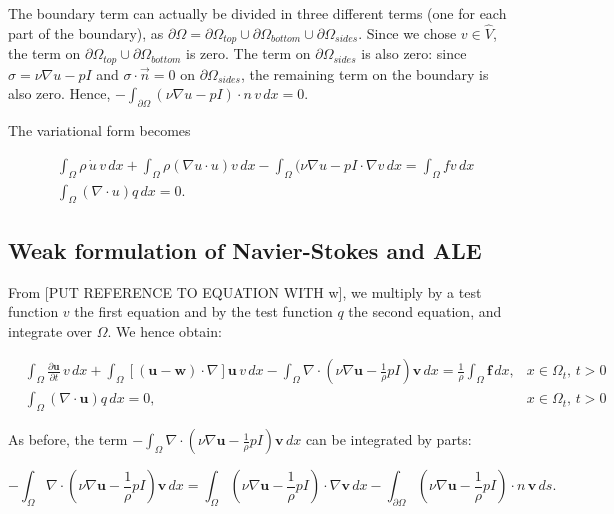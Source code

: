 \documentclass[11pt,a4paper,titlepage]{report}
\begin{document}
The boundary term can actually be divided in three different terms (one for each part of the boundary), as $\partial \Omega = \partial \Omega_{top} \cup \partial \Omega_{bottom} \cup \partial \Omega_{sides}$. Since we chose $v \in \hat{V}$, the term on $\partial \Omega_{top} \cup \partial \Omega_{bottom}$ is zero. The term on $\partial \Omega_{sides}$ is also zero: since $\sigma = \nu \nabla u - pI$ and $\sigma \cdot \vec{n} = 0$ on $\partial \Omega_{sides}$, the remaining term on the boundary is also zero. Hence, $- \int_{\partial \Omega} (\nu \nabla u - pI) \cdot n \, v \, dx = 0$.

The variational form becomes

\begin{align}
& \int_{\Omega} \rho \, \dot{u} \, v \, dx + \int_{\Omega} \rho (\nabla u \cdot u)v \, dx - \int_{\Omega} (\nu \nabla u - pI \cdot \nabla v \, dx = \int_{\Omega} fv \, dx \\
& \int_{\Omega} (\nabla \cdot u) q \, dx = 0.
\end{align}


\subsection{Weak formulation of Navier-Stokes and ALE}


From [PUT REFERENCE TO EQUATION WITH w], we multiply by a test function $v$ the first equation and by the test function $q$ the second equation, and integrate over $\Omega$. We hence obtain:


\[
\begin{aligned}
& \int_{\Omega} \frac{\partial \mathbf{u}}{\partial t} \, v \, dx 
+ \int_{\Omega} [(\mathbf{u - w}) \cdot \nabla] \mathbf{u} \, v \, dx
- \int_{\Omega} \nabla \cdot (\nu \nabla \mathbf{u} -  \frac{1}{\rho}  pI)\mathbf{v} \, dx
=  \frac{1}{\rho} \int_{\Omega} \mathbf{f} \, dx,  & x \in \Omega_t, \, t>0 \\
& \int_{\Omega}  (\nabla \cdot \mathbf{u}) q \, dx = 0 , & x \in \Omega_t, \, t>0
\end{aligned}
\]


As before, the term $- \int_{\Omega} \nabla \cdot (\nu \nabla \mathbf{u} -   \frac{1}{\rho}  pI)\mathbf{v} \, dx$ can be integrated by parts:

\[
- \int_{\Omega} \nabla \cdot (\nu \nabla \mathbf{u} -  \frac{1}{\rho} pI)\mathbf{v} \, dx =  \int_{\Omega} (\nu \nabla \mathbf{u} -  \frac{1}{\rho}  pI) \cdot \nabla \mathbf{v} \, dx - \int_{\partial \Omega} (\nu \nabla \mathbf{u} -  \frac{1}{\rho}  pI) \cdot n \, \mathbf{v} \, ds.
\]
\end{document}
